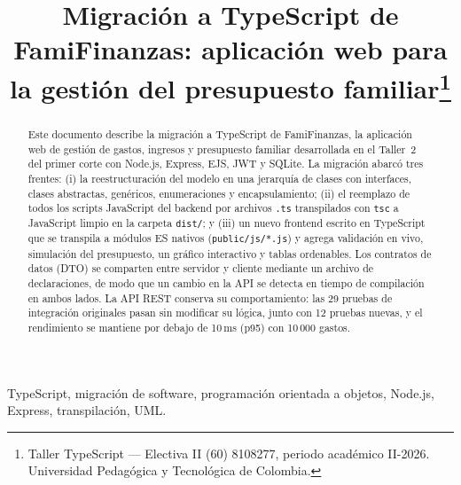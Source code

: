 \documentclass[conference,a4paper]{IEEEtran}
\begin{document}
\title{Migración a TypeScript de FamiFinanzas: aplicación web para la gestión del presupuesto familiar\thanks{Taller TypeScript --- Electiva II (60) 8108277, periodo académico II-2026. Universidad Pedagógica y Tecnológica de Colombia.}}

\author{
\and
{}
}

\maketitle

\begin{abstract}
Este documento describe la migración a TypeScript de FamiFinanzas, la aplicación web de gestión de gastos, ingresos y presupuesto familiar desarrollada en el Taller~2 del primer corte con Node.js, Express, EJS, JWT y SQLite. La migración abarcó tres frentes: (i) la reestructuración del modelo en una jerarquía de clases con interfaces, clases abstractas, genéricos, enumeraciones y encapsulamiento; (ii) el reemplazo de todos los scripts JavaScript del backend por archivos \texttt{.ts} transpilados con \texttt{tsc} a JavaScript limpio en la carpeta \texttt{dist/}; y (iii) un nuevo frontend escrito en TypeScript que se transpila a módulos ES nativos (\texttt{public/js/*.js}) y agrega validación en vivo, simulación del presupuesto, un gráfico interactivo y tablas ordenables. Los contratos de datos (DTO) se comparten entre servidor y cliente mediante un archivo de declaraciones, de modo que un cambio en la API se detecta en tiempo de compilación en ambos lados. La API REST conserva su comportamiento: las 29 pruebas de integración originales pasan sin modificar su lógica, junto con 12 pruebas nuevas, y el rendimiento se mantiene por debajo de 10\,ms (p95) con 10\,000 gastos.
\end{abstract}

\begin{IEEEkeywords}
TypeScript, migración de software, programación orientada a objetos, Node.js, Express, transpilación, UML.
\end{IEEEkeywords}
\end{document}
